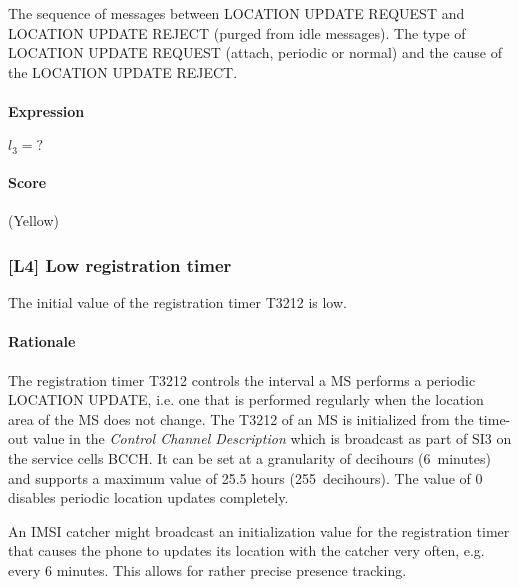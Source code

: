 \documentclass[a4paper,11pt,notitlepage,bigheadings,oneside]{scrartcl}
\begin{document}
The sequence of messages between LOCATION UPDATE REQUEST and LOCATION UPDATE
REJECT (purged from idle messages). The type of LOCATION UPDATE REQUEST
(attach, periodic or normal) and the cause of the LOCATION UPDATE REJECT.

\paragraph{Expression}

$l_3 = ?$


\paragraph{Score}

\TBD{} (Yellow)

\subsubsection{[L4] Low registration timer}

The initial value of the registration timer T3212 is low.

\paragraph{Rationale}

The registration timer T3212 controls the interval a MS performs a periodic
LOCATION UPDATE, i.e. one that is performed regularly when the location area of
the MS does not change. The T3212 of an MS is initialized from the time-out
value in the \emph{Control Channel Description} which is broadcast as part of
SI3 on the service cells BCCH. It can be set at a granularity of decihours
(6~minutes) and supports a maximum value of 25.5 hours (255~decihours). The
value of 0 disables periodic location updates completely.

An IMSI catcher might broadcast an initialization value for the registration
timer that causes the phone to updates its location with the catcher very
often, e.g. every 6 minutes. This allows for rather precise presence tracking.
\end{document}
